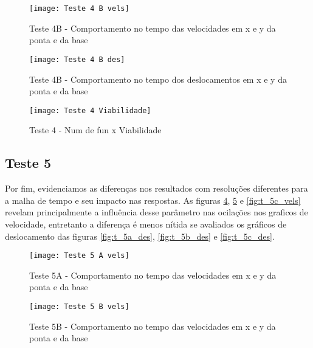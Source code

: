 \begin{figure}[!htb]
    \begin{center}
    \caption{Teste 4B - Comportamento no tempo das velocidades em x e y da ponta e da base}
    \texttt{[image: Teste 4 B vels]}
    \label{fig:t_4b_vels}
    \end{center}
\end{figure}

\begin{figure}[!htb]
    \begin{center}
    \caption{Teste 4B - Comportamento no tempo dos deslocamentos em x e y da ponta e da base}
    \texttt{[image: Teste 4 B des]}
    \label{fig:t_4b_des}
    \end{center}
\end{figure}

\begin{figure}[!htb]
    \begin{center}
    \caption{Teste 4 - Num de fun x Viabilidade}
    \texttt{[image: Teste 4 Viabilidade]}
    \label{fig:t_4_viab}
    \end{center}
\end{figure}

\subsection{Teste 5}
Por fim, evidenciamos as diferenças nos resultados com resoluções diferentes para a malha de tempo e seu impacto nas respostas.
As figuras \ref{fig:t_5a_vels}, \ref{fig:t_5b_vels} e \ref{fig:t_5c_vels} revelam principalmente a influência desse parâmetro
nas ocilações nos graficos de velocidade, entretanto a diferença é menos nítida se avaliados os gráficos de deslocamento das figuras
\ref{fig:t_5a_des}, \ref{fig:t_5b_des} e \ref{fig:t_5c_des}.

\begin{figure}[!htb]
    \begin{center}
    \caption{Teste 5A - Comportamento no tempo das velocidades em x e y da ponta e da base}
    \texttt{[image: Teste 5 A vels]}
    \label{fig:t_5a_vels}
    \end{center}
\end{figure}

\begin{figure}[!htb]
    \begin{center}
    \caption{Teste 5B - Comportamento no tempo das velocidades em x e y da ponta e da base}
    \texttt{[image: Teste 5 B vels]}
    \label{fig:t_5b_vels}
    \end{center}
\end{figure}

